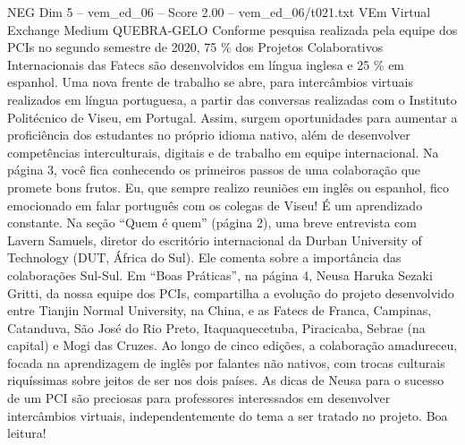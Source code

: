 \begin{textsample}{NEG Dim 5 – vem\_ed\_06 – Score 2.00 – vem\_ed\_06/t021.txt}  \label{ex:f5_neg_092}
VEm Virtual Exchange Medium QUEBRA-GELO Conforme pesquisa realizada pela equipe dos PCIs no segundo semestre de 2020, 75 \% dos Projetos Colaborativos Internacionais das Fatecs são desenvolvidos em língua inglesa e 25 \% em espanhol.
Uma nova frente de trabalho se abre, para intercâmbios virtuais realizados em língua portuguesa, a partir das conversas realizadas com o Instituto Politécnico de Viseu, em Portugal.
Assim, surgem oportunidades para aumentar a proficiência dos estudantes no próprio idioma nativo, além de desenvolver competências interculturais, digitais e de trabalho em equipe internacional.
Na página 3, você fica conhecendo os primeiros passos de uma colaboração que promete bons frutos.
Eu, que sempre realizo reuniões em inglês ou espanhol, fico emocionado em falar português com os colegas de Viseu!
É um aprendizado constante.
Na seção “Quem é quem” (página 2), uma breve entrevista com Lavern Samuels, diretor do escritório internacional da Durban University of Technology (DUT, África do Sul).
Ele comenta sobre a importância das colaborações Sul-Sul.
Em “Boas Práticas”, na página 4, Neusa Haruka Sezaki Gritti, da nossa equipe dos PCIs, compartilha a evolução do projeto desenvolvido entre Tianjin Normal University, na China, e as Fatecs de Franca, Campinas, Catanduva, São José do Rio Preto, Itaquaquecetuba, Piracicaba, Sebrae (na capital) e Mogi das Cruzes.
Ao longo de cinco edições, a colaboração amadureceu, focada na aprendizagem de inglês por falantes não nativos, com trocas culturais riquíssimas sobre jeitos de ser nos dois países.
As dicas de Neusa para o sucesso de um PCI são preciosas para professores interessados em desenvolver intercâmbios virtuais, independentemente do tema a ser tratado no projeto.
Boa leitura!

\end{textsample}
